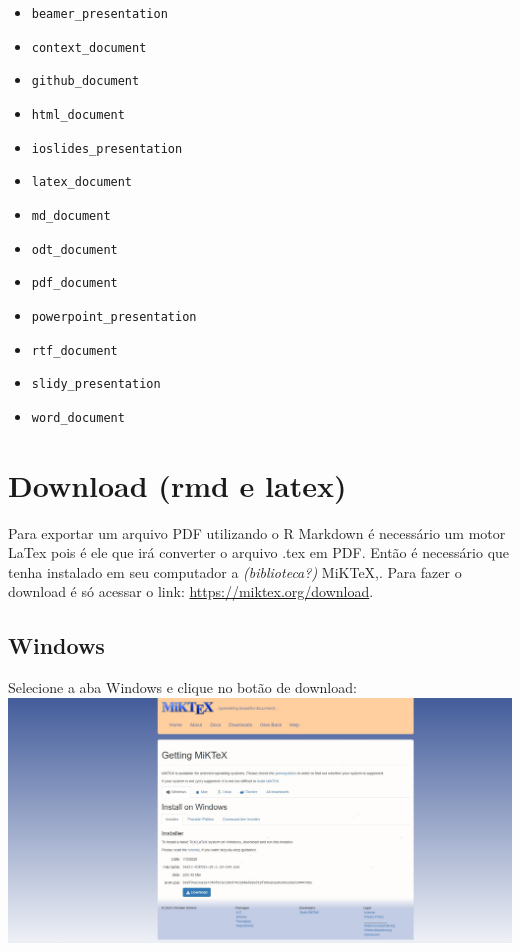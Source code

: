 \documentclass[
]{book}
\providecommand{\tightlist}{%
  \setlength{\itemsep}{0pt}\setlength{\parskip}{0pt}}
\begin{document}
\begin{itemize}
\tightlist
\item
  \texttt{beamer\_presentation}
\item
  \texttt{context\_document}
\item
  \texttt{github\_document}
\item
  \texttt{html\_document}
\item
  \texttt{ioslides\_presentation}
\item
  \texttt{latex\_document}
\item
  \texttt{md\_document}
\item
  \texttt{odt\_document}
\item
  \texttt{pdf\_document}
\item
  \texttt{powerpoint\_presentation}
\item
  \texttt{rtf\_document}
\item
  \texttt{slidy\_presentation}
\item
  \texttt{word\_document}
\end{itemize}

\hypertarget{download-rmd-e-latex}{%
\section{Download (rmd e latex)}\label{download-rmd-e-latex}}

Para exportar um arquivo PDF utilizando o R Markdown é necessário um motor LaTex pois é ele que irá converter o arquivo .tex em PDF.
Então é necessário que tenha instalado em seu computador a \emph{(biblioteca?)} MiKTeX,. Para fazer o download é só acessar o link: \url{https://miktex.org/download}.

\hypertarget{windows}{%
\subsection{Windows}\label{windows}}

Selecione a aba Windows e clique no botão de download:
\includegraphics{img/download_windowns_MiKTex.jpg}
\end{document}
